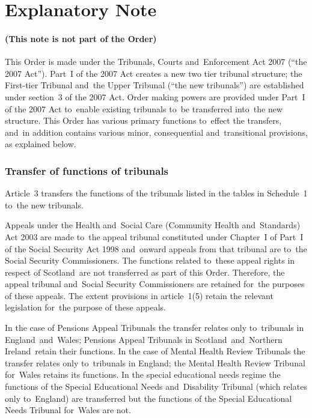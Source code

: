 \documentclass[12pt,a4paper]{article}
\begin{document}
\part{Explanatory Note}

\renewcommand\parthead{— Explanatory Note}

\subsection*{(This note is not part of the Order)}

This Order is made under the Tribunals, Courts and~Enforcement Act 2007 (“the 2007 Act”). Part~I of the 2007 Act creates a new two tier tribunal structure; the First-tier Tribunal and~the Upper Tribunal (“the new tribunals”) are established under section~3 of the 2007 Act. Order making powers are provided under Part~I of the 2007 Act to~enable existing tribunals to~be transferred into~the new structure. This Order has various primary functions to~effect the transfers, and~in addition contains various minor, consequential and~transitional provisions, as explained below.

\section*{Transfer of functions of tribunals}

Article~3 transfers the functions of the tribunals listed in the tables in Schedule~1 to~the new tribunals.

Appeals under the Health and~Social Care (Community Health and~Standards) Act 2003 are made to~the appeal tribunal constituted under Chapter~I of Part~I of the Social Security Act 1998 and~onward appeals from that tribunal are to~the Social Security Commissioners. The functions related to~these appeal rights in respect of Scotland~are not transferred as part of this Order. Therefore, the appeal tribunal and~Social Security Commissioners are retained for~the purposes of these appeals. The extent provisions in article~1(5) retain the relevant legislation for~the purpose of these appeals.

In the case of Pensions Appeal Tribunals the transfer relates only to~tribunals in England~and~Wales; Pensions Appeal Tribunals in Scotland~and~Northern Ireland~retain their functions. In the case of Mental Health Review Tribunals the transfer relates only to~tribunals in England; the Mental Health Review Tribunal for~Wales retains its functions. In the special educational needs regime the functions of the Special Educational Needs and~Disability Tribunal (which relates only to~England) are transferred but the functions of the Special Educational Needs Tribunal for~Wales are not.
\end{document}
